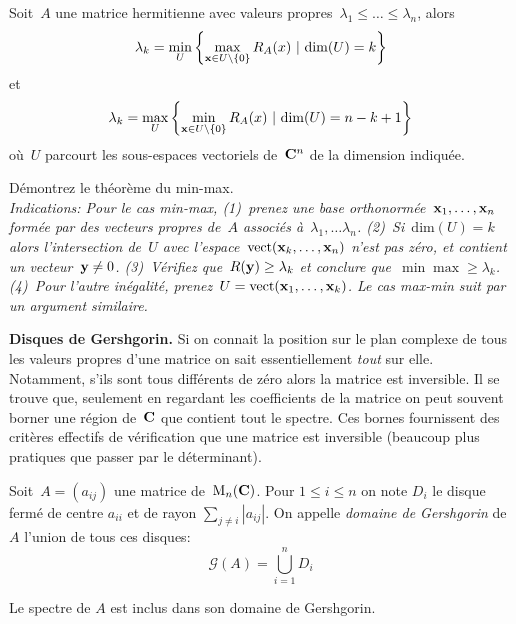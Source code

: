 \begin{proposition}
	Soit~$A$ une matrice hermitienne avec valeurs
	propres~$\lambda_1\le\ldots\le\lambda_n$, alors
	\[
		\lambda_k = \min_U\left\{ \max_{\mathbf{x}\in U\setminus\{0\}} R_A(x) \ |\ \mathrm{dim}(U)=k\right\}
	\]
	et
	\[
		\lambda_k = \max_U\left\{ \min_{\x\in
		U\setminus\{0\}}R_A(x) \ |\ \mathrm{dim}(U)=n-k+1\right\}
	\]
	où~$U$ parcourt les sous-espaces vectoriels de~$\mathbf{C}^n$ de la dimension
	indiquée.
\end{proposition}

\begin{exercice}
	Démontrez le théorème du min-max.\\
	\emph{
		Indications: Pour le cas min-max, (1)~prenez une base
		orthonormée~$\mathbf{x}_1,\ldots,\mathbf{x}_n$ formée par des vecteurs propres de~$A$
		associés à~$\lambda_1,\ldots\lambda_n$.  (2)~Si~$\mathrm{dim}(U)=k$ alors
		l'intersection de~$U$ avec l'espace~$\mathrm{vect}(\mathbf{x}_k,\ldots,\mathbf{x}_n)$
		n'est pas zéro, et contient un vecteur~$\mathbf{y}\neq0$. (3)~Vérifiez
		que~$R(\mathbf{y})\ge\lambda_k$ et conclure que~$\min\max\ge\lambda_k$. (4)~Pour
		l'autre inégalité, prenez~$U=\mathrm{vect}(\mathbf{x}_1,\ldots,\mathbf{x}_k)$.  Le cas
		max-min suit par un argument similaire.
}
\end{exercice}



{\bf Disques de Gershgorin.}
Si on connait la position sur le plan complexe
de tous les valeurs propres d'une matrice on sait essentiellement \emph{tout}
sur elle.  Notamment, s'ils sont tous différents de zéro alors la matrice est
inversible.  Il se trouve que, seulement en regardant les coefficients de la
matrice on peut souvent borner une région de~$\mathbf{C}$ que contient tout le
spectre.  Ces bornes fournissent des critères effectifs de vérification que
une matrice est inversible (beaucoup plus pratiques que passer par le
déterminant).

\begin{definition}
	Soit~$A=(a_{ij})$ une matrice de~$\mathrm{M}_n(\mathbf{C})$.
Pour $1\leq i\leq n$ on note $D_i$ le disque fermé de centre $a_{ii}$ et de
rayon $\sum_{j\neq i} |a_{ij}|$. On appelle \emph{domaine de Gershgorin} de
$A$ l'union de tous ces disques:
\[
\mathcal G(A) = \bigcup_{i=1}^n D_i
\]
\end{definition}
\begin{proposition}
	\label{prop:gersh}
	Le spectre de $A$ est inclus dans son domaine de Gershgorin.
\end{proposition}


